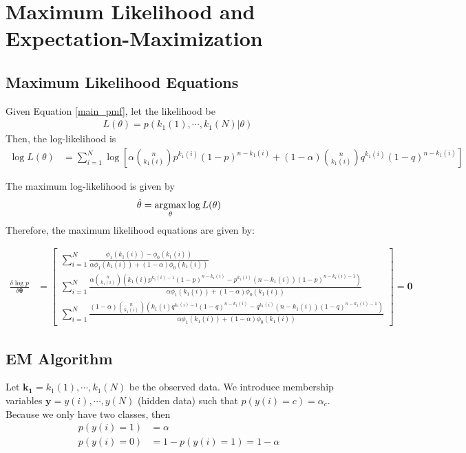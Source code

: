 \section{Maximum Likelihood and Expectation-Maximization}

\subsection{Maximum Likelihood Equations}
Given Equation \ref{main_pmf}, let the likelihood be
\begin{align*}
L(\mathbb{\theta}) = p(k_1(1), \cdots, k_1(N) | \mathbb{\theta})\ 
\end{align*}
Then, the log-likelihood is
\begin{align*}
\log L(\mathbb{\theta}) &= \sum_{i=1}^{N} \log \left[ \alpha \binom{n}{k_1(i)} p^{k_1(i)} (1-p)^{n - k_1(i)} + (1-\alpha) \binom{n}{k_1(i)} q^{k_1(i)} (1-q)^{n - k_1(i)}  \right] 
\end{align*}

The maximum log-likelihood is given by
\begin{align*}
\hat{\theta} = \operatorname*{\arg\!\max}_{\theta} \log L(\mathbb{\theta})
\end{align*}
Therefore, the maximum likelihood equations are given by:

\begin{align*}
\frac{\delta \log p}{\delta \mathbf{\theta}} &= \begin{bmatrix} 
\sum_{i=1}^{N} \frac{\phi_1(k_1(i)) - \phi_0(k_1(i))}{\alpha \phi_1(k_1(i)) + (1-\alpha)\phi_0(k_1(i))} \\ 
\sum_{i=1}^{N} \frac{\alpha \binom{n}{k_1(i)} \left( k_1(i) p^{k_1(i)-1} (1-p)^{n-k_1(i)} - p^{k_1(i)} (n-k_1(i)) (1-p)^{n-k_1(i)-1} \right) }{\alpha \phi_1(k_1(i)) + (1-\alpha)\phi_0(k_1(i))} \\ 
\sum_{i=1}^{N} \frac{(1-\alpha) \binom{n}{k_1(i)} \left( k_1(i) q^{k_1(i)-1} (1-q)^{n-k_1(i)} - q^{k_1(i)} (n-k_1(i)) (1-q)^{n-k_1(i)-1} \right) }{\alpha \phi_1(k_1(i)) + (1-\alpha)\phi_0(k_1(i))} \end{bmatrix} = \mathbf{0}
\end{align*}

\subsection{EM Algorithm}

Let $\mathbf{k_1} = k_1(1), \cdots, k_1(N)$ be the observed data. 
We introduce membership variables $\mathbf{y} = y(i), \cdots, y(N)$ (hidden data) such that $p(y(i) = c) = \alpha_c$. Because we only have two classes, then 
\begin{align*}
p(y(i) = 1) &= \alpha \\
p(y(i) = 0) &= 1-p(y(i) = 1) = 1 - \alpha
\end{align*}

